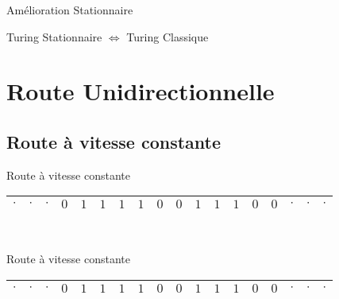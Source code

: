 \documentclass[12pt]{beamer}
\begin{document}
\begin{frame}{Amélioration Stationnaire}
\begin{center}
    \begin{tcolorbox}[colframe=red, hbox]
    \large Turing Stationnaire $\Longleftrightarrow$ Turing Classique
\end{tcolorbox}
\end{center}

\end{frame}






\section{Route Unidirectionnelle}
\subsection{Route à vitesse constante}
\begin{frame}{Route à vitesse constante}
\begin{center}
    \begin{tabular}{|c|c|c|c|c|c|c|c|c|c|c|c|c|c|c|c|c|c|}\hline
     $\cdot$ & $\cdot$ & $\cdot$ & $0$ & $1$ & $1$ & $1$ & $1$ & $0$ & $0$ & $1$ & $1$ & $1$ & $0$ & $0$ & $\cdot$ & $\cdot$ & $\cdot$ \\\hline
     
\end{tabular}\\
\end{center}
\end{frame}

\begin{frame}{Route à vitesse constante}
\begin{center}
    \begin{tabular}{|c|c|c|c|c|c|c|c|c|c|c|c|c|c|c|c|c|c|}\hline
     $\cdot$ & $\cdot$ & $\cdot$ & $0$ & $1$ & $1$ & $1$ & $1$ & $0$ & $0$ & $1$ & $1$ & $1$ & $0$ & $0$ & $\cdot$ & $\cdot$ & $\cdot$ \\\hline
     
\end{tabular}\\
\end{center}
\end{frame}
\end{document}
